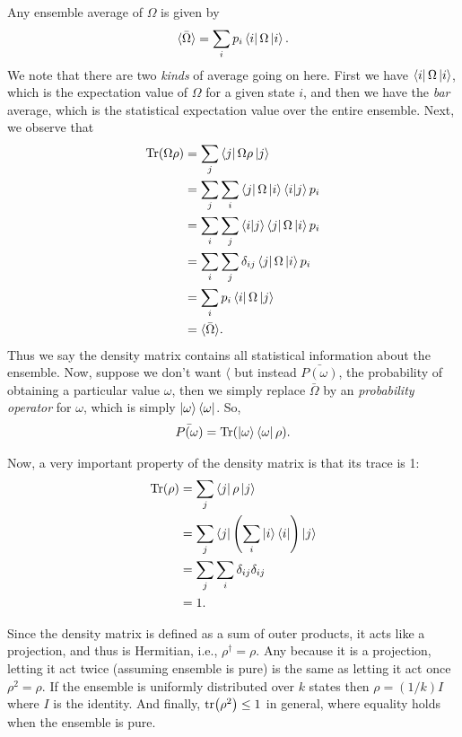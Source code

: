 \documentclass{book}
\theoremstyle{definition}
\newcommand{\lp}{\left(}
\newcommand{\rp}{\right)}
\begin{document}
Any ensemble average of $\Omega$ is given by
\begin{align}
\langle \bar{\Omega} \rangle = \sum_i p_i \bra{i}\Omega\ket{i}.
\end{align}
We note that there are two \textit{kinds} of average going on here. First we have $\bra{i}\Omega\ket{i}$, which is the expectation value of $\Omega$ for a given state $i$, and then we have the \textit{bar} average, which is the statistical expectation value over the entire ensemble. Next, we observe that
\begin{align}
\Tr(\Omega \rho) &= \sum_j \bra{j}\Omega \rho \ket{j}\\
&= \sum_j \sum_i    \bra{j}\Omega\ket{i}\bra{i}\ket{j}p_i\\
&= \sum_i \sum_j \braket{i}{j}\bra{j}\Omega\ket{i}p_i\\
&= \sum_i \sum_j \delta_{ij}  \bra{j}\Omega\ket{i}p_i\\
&= \sum_i p_i \bra{i}\Omega\ket{j}\\
&= \langle \bar{\Omega} \rangle.
\end{align}
Thus we say the density matrix contains all statistical information about the ensemble. Now, suppose we don't want $\langle $ but instead $\bar{P(\omega)}$, the probability of obtaining a particular value $\omega$, then we simply replace $\bar{\Omega}$ by an \textit{probability operator} for $\omega$, which is simply $\ket{\omega}\bra{\omega}$. So,
\begin{align}
\bar{P(\omega)} = \Tr(\ket{\omega}\bra{\omega} \rho).
\end{align}

Now, a very important property of the density matrix is that its trace is 1:
\begin{align}
\Tr(\rho) &= \sum_j \bra{j} \rho \ket{j} \\ 
&= \sum_j \bra{j}  \lp\sum_i \ket{i}\bra{i} \rp \ket{j}\\
&= \sum_j \sum_i \delta_{ij}\delta_{ij}\\
&= 1.
\end{align}

Since the density matrix is defined as a sum of outer products, it acts like a projection, and thus is Hermitian, i.e., $\rho^\dagger = \rho$. Any because it is a projection, letting it act twice (assuming ensemble is pure) is the same as letting it act once $\rho^2 = \rho$. If the ensemble is uniformly distributed over $k$ states then $\rho = (1/k)I$ where $I$ is the identity. And finally, $\tr(\rho^2) \leq 1$ in general, where equality holds when the ensemble is pure.
\end{document}

